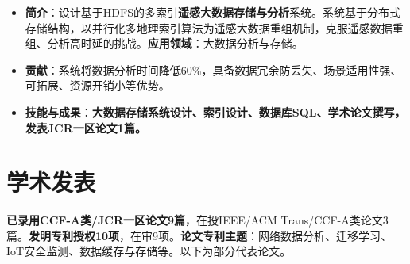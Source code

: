 \documentclass[UTF8,letterpaper,11pt]{article}
\begin{document}
\begin{itemize}
  \setlength\itemsep{2.0pt}
  \item \textbf{简介}：设计基于HDFS的多索引\textbf{遥感大数据存储与分析}系统。系统基于分布式存储结构，以并行化多地理索引算法为遥感大数据重组机制，克服遥感数据重组、分析高时延的挑战。\textbf{应用领域}：大数据分析与存储。
  \item \textbf{贡献}：系统将数据分析时间降低60\%，具备数据冗余防丢失、场景适用性强、可拓展、资源开销小等优势。
  \item \textbf{技能与成果}：\textbf{大数据存储系统设计、索引设计、数据库SQL、学术论文撰写，发表JCR一区论文1篇。}
\end{itemize}




\section{\textbf{学术发表}}

\textbf{已录用CCF-A类/JCR一区论文9篇}，在投IEEE/ACM Trans/CCF-A类论文3篇。\textbf{发明专利授权10项}，在审9项。\textbf{论文专利主题}：网络数据分析、迁移学习、IoT安全监测、数据缓存与存储等。以下为部分代表论文。
\end{document}
